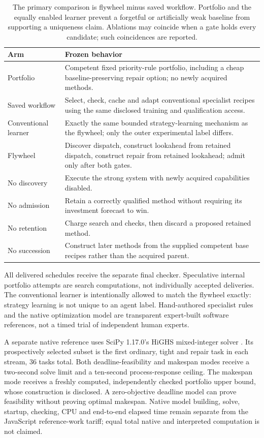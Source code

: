 \begin{table}[ht]\centering\small
\begin{tabularx}{\linewidth}{L{31mm}Y}
\toprule
Arm & Frozen behavior \\
\midrule
Portfolio & Competent fixed priority-rule portfolio, including a cheap baseline-preserving repair option; no newly acquired methods. \\
Saved workflow & Select, check, cache and adapt conventional specialist recipes using the same disclosed training and qualification access. \\
Conventional learner & Exactly the same bounded strategy-learning mechanism as the flywheel; only the outer experimental label differs. \\
Flywheel & Discover dispatch, construct lookahead from retained dispatch, construct repair from retained lookahead; admit only after both gates. \\
No discovery & Execute the strong system with newly acquired capabilities disabled. \\
No admission & Retain a correctly qualified method without requiring its investment forecast to win. \\
No retention & Charge search and checks, then discard a proposed retained method. \\
No succession & Construct later methods from the supplied competent base recipes rather than the acquired parent. \\
\bottomrule
\end{tabularx}
\caption{The primary comparison is flywheel minus saved workflow. Portfolio and the equally enabled learner prevent a forgetful or artificially weak baseline from supporting a uniqueness claim. Ablations may coincide when a gate holds every candidate; such coincidences are reported.}
\end{table}

All delivered schedules receive the separate final checker. Speculative internal portfolio attempts are search computations, not individually accepted deliveries. The conventional learner is intentionally allowed to match the flywheel exactly: strategy learning is not unique to an agent label. Hand-authored specialist rules and the native optimization model are transparent expert-built software references, not a timed trial of independent human experts.

A separate native reference uses SciPy 1.17.0's HiGHS mixed-integer solver \citep{scipy117milp,highs}. Its prospectively selected subset is the first ordinary, tight and repair task in each stream, 36 tasks total. Both deadline-feasibility and makespan modes receive a two-second solve limit and a ten-second process-response ceiling. The makespan mode receives a freshly computed, independently checked portfolio upper bound, whose construction is disclosed. A zero-objective deadline model can prove feasibility without proving optimal makespan. Native model building, solve, startup, checking, CPU and end-to-end elapsed time remain separate from the JavaScript reference-work tariff; equal total native and interpreted computation is not claimed.


